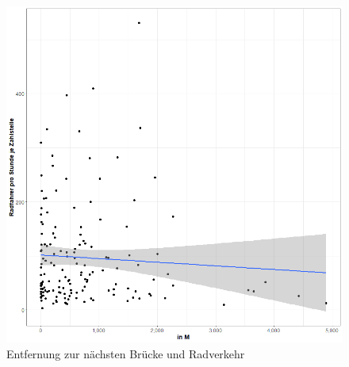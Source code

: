 \documentclass[a4paper,12pt]{thesis}
\begin{document}
\begin{figure}[!ht]
	\centering
	\includegraphics[width=\textwidth]{Plots/plot21.png}
	\caption{Entfernung zur nächsten Brücke und Radverkehr}
	\label{Bridge}
\end{figure}

\newpage
{}

\end{document}
